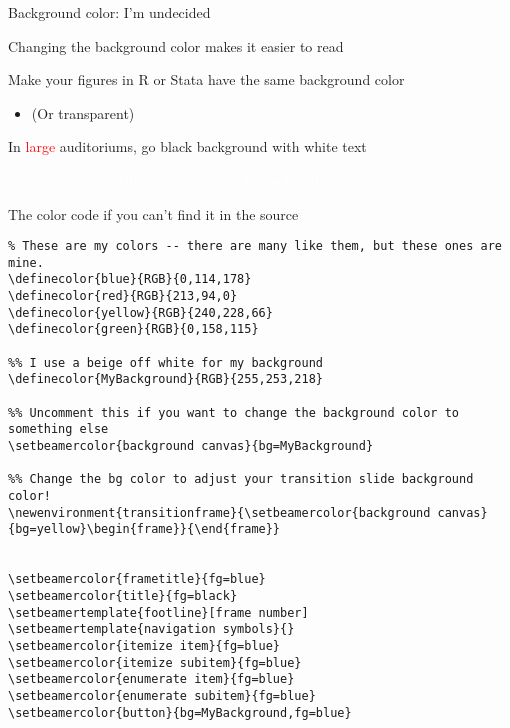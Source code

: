 \documentclass[notes,11pt, aspectratio=169]{beamer}
\newenvironment{wideitemize}{\itemize\addtolength{\itemsep}{10pt}}{\enditemize}
\begin{document}
\begin{frame}{Background color: I'm undecided}
  \begin{wideitemize}
    \item Changing the background color makes it easier to read
    \item Make your figures in R or Stata have the same background color 
      \begin{itemize}
      \item[] (Or transparent)
      \end{itemize}
    \item In \textcolor{red}{large} auditoriums, go black background with white text
  \end{wideitemize}
\end{frame}

{  
\begin{frame}
  \textcolor{white}{Example for an auditorium -- contrast is much higher}
\end{frame}
}
\begin{frame}[fragile]{The color code if you can't find it in the source}
\tiny
\begin{verbatim}
% These are my colors -- there are many like them, but these ones are mine.
\definecolor{blue}{RGB}{0,114,178}
\definecolor{red}{RGB}{213,94,0}
\definecolor{yellow}{RGB}{240,228,66}
\definecolor{green}{RGB}{0,158,115}

%% I use a beige off white for my background
\definecolor{MyBackground}{RGB}{255,253,218}

%% Uncomment this if you want to change the background color to something else
\setbeamercolor{background canvas}{bg=MyBackground}

%% Change the bg color to adjust your transition slide background color!
\newenvironment{transitionframe}{\setbeamercolor{background canvas}{bg=yellow}\begin{frame}}{\end{frame}}


\setbeamercolor{frametitle}{fg=blue}
\setbeamercolor{title}{fg=black}
\setbeamertemplate{footline}[frame number]
\setbeamertemplate{navigation symbols}{} 
\setbeamercolor{itemize item}{fg=blue}
\setbeamercolor{itemize subitem}{fg=blue}
\setbeamercolor{enumerate item}{fg=blue}
\setbeamercolor{enumerate subitem}{fg=blue}
\setbeamercolor{button}{bg=MyBackground,fg=blue}
\end{verbatim}
\end{frame}
\end{document}
